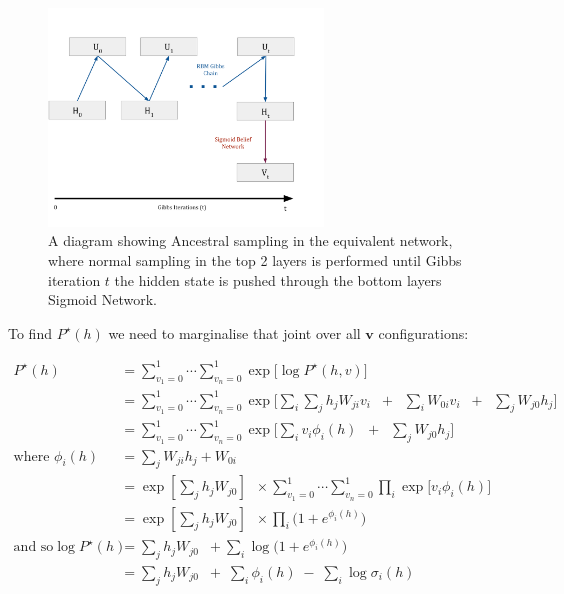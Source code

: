 \begin{figure}[h]
\begin{center}
  \includegraphics[width = 0.65\textwidth]{Assets/ORBM-Gibbs-Chain.png}
\caption{A diagram showing Ancestral sampling in the equivalent network, where normal sampling in the top 2 layers is performed until Gibbs iteration $t$ the hidden state is pushed through the bottom layers Sigmoid Network.}
\label{F:3-Layer-RBM-Gibbs}
\end{center}
\end{figure}



To find $P^\star(h)$ we need to marginalise that joint over all $\mathbf{v}$ configurations:

$$
 \begin{aligned}
P^\star(h) &= \sum_{v_1=0}^1 \cdots \sum_{v_n=0}^1 \exp \bigg[  \log P^{\star}(h,v) \bigg] \\
&= \sum_{v_1=0}^1 \cdots \sum_{v_n=0}^1 \exp \bigg[  \sum_i  \sum_j h_j W_{ji} v_i \;\; + \;\; \sum_i W_{0i} v_i \;\; + \;\; \sum_j W_{j0} h_j \bigg] \\
&= \sum_{v_1=0}^1 \cdots \sum_{v_n=0}^1 \exp \bigg[  \sum_i v_i \phi_i(h)  \;\; + \;\; \sum_j W_{j0} h_j \bigg] \\
\text{where } \phi_i(h) &= \sum_j W_{ji} h_j + W_{0i} \\
&= \exp\left[ \sum_j h_j  W_{j0} \right] \;\; \times \sum_{v_1=0}^1 \cdots \sum_{v_n=0}^1 \prod_i \exp\bigg[ v_i \phi_i(h) \bigg] \\
&= \exp\left[\sum_j h_j  W_{j0}\right] \;\; \times \prod_i \bigg( 1 + e^{\phi_i(h) } \bigg) \\
\text{and so}
\log P^\star(h) &= \sum_j h_j  W_{j0} \;\; +  \sum_i \log \bigg( 1 + e^{\phi_i(h) } \bigg)
\\
&= \sum_j h_j  W_{j0} \;\; + \; \sum_i \phi_i(h) \;  - \; \sum_i \log \sigma_i(h)
\end{aligned}
$$

